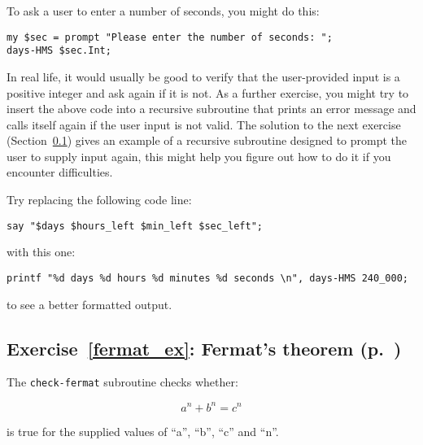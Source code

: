 To ask a user to enter a number of seconds, you might 
do this:

\begin{verbatim}
my $sec = prompt "Please enter the number of seconds: ";
days-HMS $sec.Int;
\end{verbatim}

In real life, it would usually be good to verify that the 
user-provided input is a positive integer and ask again if it is 
not. As a further exercise, you might try to insert the 
above code into a recursive subroutine that prints an 
error message and calls itself again if the user input is 
not valid. The solution to the next exercise 
(Section~\ref{sol_fermat_ex}) gives an example of a recursive 
subroutine designed to prompt 
the user to supply input again, this might help you figure 
out how to do it if you encounter difficulties. 

Try replacing the following code line:
\begin{verbatim}
say "$days $hours_left $min_left $sec_left"; 
\end{verbatim}
%
with this one:

\begin{verbatim}
printf "%d days %d hours %d minutes %d seconds \n", days-HMS 240_000;
\end{verbatim}
to see a better formatted output.

\subsection{Exercise~\ref{fermat_ex}: Fermat's theorem (p.~\pageref{fermat_ex})}
\label{sol_fermat_ex}

The {\tt check-fermat} subroutine checks whether:

\[ a^n + b^n = c^n \]
%

is true for the supplied values of ``a'', ``b'', ``c'' and 
``n''.

